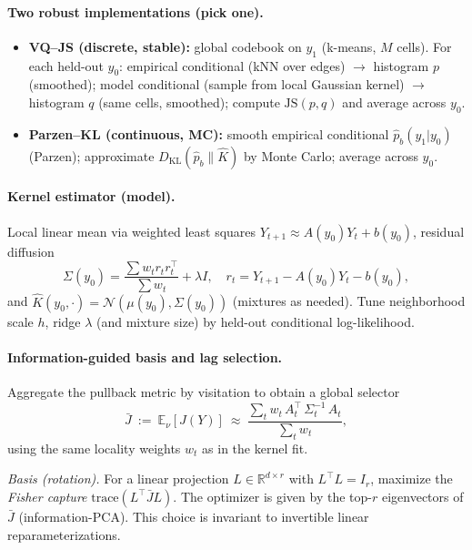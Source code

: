 \documentclass[11pt]{article}
\newcommand{\R}{\mathbb{R}}
\newcommand{\E}{\mathbb{E}}
\newcommand{\1}{\mathbf{1}}
\begin{document}
\paragraph{Two robust implementations (pick one).}
\begin{itemize}[leftmargin=1.7em,itemsep=2pt,topsep=2pt]
\item \textbf{VQ--JS (discrete, stable):} global codebook on \(y_1\) (k-means, \(M\) cells). For each held-out \(y_0\):
empirical conditional (kNN over edges) \(\to\) histogram \(p\) (smoothed);
model conditional (sample from local Gaussian kernel) \(\to\) histogram \(q\) (same cells, smoothed);
compute \(\text{JS}(p,q)\) and average across \(y_0\).
\item \textbf{Parzen--KL (continuous, MC):} smooth empirical conditional \(\hat p_b(y_1|y_0)\) (Parzen); approximate \(D_{\mathrm{KL}}(\hat p_b\|\hat K)\) by Monte Carlo; average across \(y_0\).
\end{itemize}

\paragraph{Kernel estimator (model).}
Local linear mean via weighted least squares \(Y_{t+1}\approx A(y_0)Y_t+b(y_0)\), residual diffusion
\[
\Sigma(y_0)=\frac{\sum w_t r_t r_t^\top}{\sum w_t}+\lambda I,\quad r_t=Y_{t+1}-A(y_0)Y_t-b(y_0),
\]
and \(\hat K(y_0,\cdot)=\mathcal N(\mu(y_0),\Sigma(y_0))\) (mixtures as needed).
Tune neighborhood scale \(h\), ridge \(\lambda\) (and mixture size) by held-out conditional log-likelihood.

\paragraph{Information-guided basis and lag selection.}
Aggregate the pullback metric by visitation to obtain a global selector
\[
\bar J\ :=\ \E_\nu[J(Y)]\ \approx\ \frac{\sum_t w_t\,A_t^\top\,\Sigma_t^{-1}\,A_t}{\sum_t w_t},
\]
using the same locality weights $w_t$ as in the kernel fit.

\emph{Basis (rotation).} For a linear projection $L\in\R^{d\times r}$ with $L^\top L=I_r$, maximize the
\emph{Fisher capture} $\mathrm{trace}(L^\top \bar J L)$. The optimizer is given by the top-$r$
eigenvectors of $\bar J$ (information-PCA). This choice is invariant to invertible linear reparameterizations.
\end{document}
